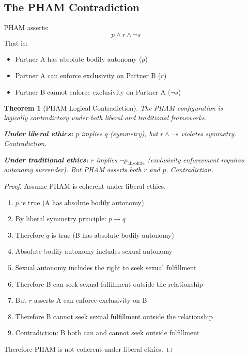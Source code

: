 \documentclass[12pt,openany]{book}
\newtheorem{theorem}{Theorem}[chapter]
\numberwithin{equation}{chapter}
\begin{document}
\subsection{The PHAM Contradiction}

PHAM asserts:
\[
p \land r \land \neg s
\]
That is:
\begin{itemize}
    \item Partner A has absolute bodily autonomy ($p$)
    \item Partner A can enforce exclusivity on Partner B ($r$)
    \item Partner B cannot enforce exclusivity on Partner A ($\neg s$)
\end{itemize}

\begin{theorem}[PHAM Logical Contradiction]
The PHAM configuration is logically contradictory under both liberal and traditional frameworks.

\textbf{Under liberal ethics:}
$p$ implies $q$ (symmetry), but $r \land \neg s$ violates symmetry. Contradiction.

\textbf{Under traditional ethics:}
$r$ implies $\neg p_{\text{absolute}}$ (exclusivity enforcement requires autonomy surrender). But PHAM asserts both $r$ and $p$. Contradiction.
\end{theorem}

\begin{proof}
Assume PHAM is coherent under liberal ethics.
\begin{enumerate}
    \item $p$ is true (A has absolute bodily autonomy)
    \item By liberal symmetry principle: $p \rightarrow q$
    \item Therefore $q$ is true (B has absolute bodily autonomy)
    \item Absolute bodily autonomy includes sexual autonomy
    \item Sexual autonomy includes the right to seek sexual fulfillment
    \item Therefore B can seek sexual fulfillment outside the relationship
    \item But $r$ asserts A can enforce exclusivity on B
    \item Therefore B cannot seek sexual fulfillment outside the relationship
    \item Contradiction: B both can and cannot seek outside fulfillment
\end{enumerate}
Therefore PHAM is not coherent under liberal ethics.
\renewcommand{\qedsymbol}{}
\end{proof}
\end{document}
